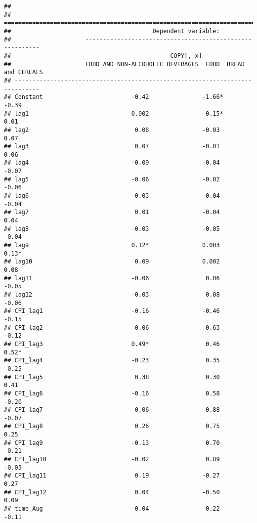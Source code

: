 \documentclass[
]{article}
\begin{document}
\begin{verbatim}
## 
## =============================================================================
##                                        Dependent variable:                   
##                     ---------------------------------------------------------
##                                             COPY[, x]                        
##                     FOOD AND NON-ALCOHOLIC BEVERAGES  FOOD  BREAD and CEREALS
## -----------------------------------------------------------------------------
## Constant                         -0.42               -1.66*       -0.39      
## lag1                             0.002               -0.15*       0.01       
## lag2                              0.08               -0.03        0.07       
## lag3                              0.07               -0.01        0.06       
## lag4                             -0.09               -0.04        -0.07      
## lag5                             -0.06               -0.02        -0.06      
## lag6                             -0.03               -0.04        -0.04      
## lag7                              0.01               -0.04        0.04       
## lag8                             -0.03               -0.05        -0.04      
## lag9                             0.12*               0.003        0.13*      
## lag10                             0.09               0.002        0.08       
## lag11                            -0.06                0.06        -0.05      
## lag12                            -0.03                0.08        -0.06      
## CPI_lag1                         -0.16               -0.46        -0.15      
## CPI_lag2                         -0.06                0.63        -0.12      
## CPI_lag3                         0.49*                0.46        0.52*      
## CPI_lag4                         -0.23                0.35        -0.25      
## CPI_lag5                          0.38                0.30        0.41       
## CPI_lag6                         -0.16                0.58        -0.20      
## CPI_lag7                         -0.06               -0.88        -0.07      
## CPI_lag8                          0.26                0.75        0.25       
## CPI_lag9                         -0.13                0.70        -0.21      
## CPI_lag10                        -0.02                0.89        -0.05      
## CPI_lag11                         0.19               -0.27        0.27       
## CPI_lag12                         0.04               -0.50        0.09       
## time_Aug                         -0.04                0.22        -0.11      

\end{verbatim}
\end{document}
